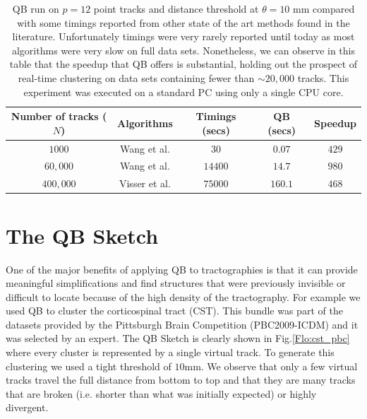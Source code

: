 \documentclass[preprint,authoryear,a4paper,10pt,onecolumn]{elsarticle}
\begin{document}
%
\begin{table}
\small\addtolength{\tabcolsep}{-5pt}

\begin{centering}
\begin{tabular}{|c|c|c|c|c|}
\hline 
Number of tracks ($N$) & Algorithms & Timings (secs) & QB (secs) & Speedup\tabularnewline
\hline
\hline 
$1000$ & Wang et al. \cite{wang2010tractography} & $30$ & $0.07$ & $429$\tabularnewline
\hline 
$60,000$ & Wang et al. \cite{wang2010tractography} & $14400$ & $14.7$ & $980$\tabularnewline
\hline 
$400,000$ & Visser et al. \cite{Visser2010} & $75000$ & $160.1$ & $468$\tabularnewline
\hline
\end{tabular}
\par\end{centering}
\caption{QB run on $p=12$ point tracks and distance threshold at $\theta=10$ mm
compared with some timings reported from other state of the art methods
found in the literature. Unfortunately timings were very rarely reported
until today as most algorithms were very slow on full data sets. Nonetheless,
we can observe in this table that the speedup that QB offers is substantial,
holding out the prospect of real-time clustering on data sets containing
fewer than $\sim 20,000$ tracks. This experiment was executed on a
standard PC using only a single CPU core.\label{Flo:timings}}
\end{table}

\section{The QB Sketch}

One of the major benefits of applying QB to tractographies is that it
can provide meaningful simplifications and find structures that were
previously invisible or difficult to locate because of the high density
of the tractography. For example we used QB to cluster the corticospinal
tract (CST). This bundle was part of the datasets provided by the
Pittsburgh Brain Competition (PBC2009-ICDM) and it was selected by an
expert. The QB Sketch is clearly shown in Fig.\ref{Flo:cst_pbc} where
every cluster is represented by a single virtual track. To generate this
clustering we used a tight threshold of $10$mm. We observe that only a
few virtual tracks travel the full distance from bottom to top and that
they are many tracks that are broken (i.e. shorter than what was
initially expected) or highly divergent.
\end{document}
